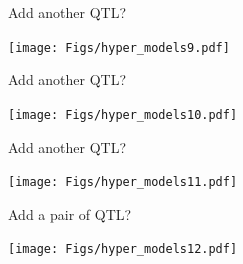\documentclass[12pt]{article}
\newcommand{\headsize}{\fontsize{35}{35} \selectfont}
\newcommand{\smallersize}{\fontsize{20}{25} \selectfont}
\begin{document}
\headsize \color{myyellow}
\hfill \begin{minipage}{5.75in}
\centering
Add another QTL?
\end{minipage}

\vfill


\centerline{\texttt{[image: Figs/hyper\_models9.pdf]}}



\newpage


\addtocounter{page}{-1}

\headsize \color{myyellow}
\hfill \begin{minipage}{5.75in}
\centering
Add another QTL?
\end{minipage}

\vfill


\centerline{\texttt{[image: Figs/hyper\_models10.pdf]}}



\newpage


\addtocounter{page}{-1}

\headsize \color{myyellow}
\hfill \begin{minipage}{5.75in}
\centering
Add another QTL?
\end{minipage}

\vfill


\centerline{\texttt{[image: Figs/hyper\_models11.pdf]}}



\newpage



\headsize \color{myyellow}
\hfill \begin{minipage}{5.75in}
\centering
Add a pair of QTL?
\end{minipage}

\vfill


\centerline{\texttt{[image: Figs/hyper\_models12.pdf]}}






%
%
%
%
%
\end{document}
